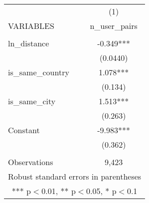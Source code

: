 \begin{tabular}{lc} \hline
 & (1) \\
VARIABLES & n\_user\_pairs \\ \hline
 &  \\
ln\_distance & -0.349*** \\
 & (0.0440) \\
is\_same\_country & 1.078*** \\
 & (0.134) \\
is\_same\_city & 1.513*** \\
 & (0.263) \\
Constant & -9.983*** \\
 & (0.362) \\
 &  \\
 Observations & 9,423 \\ \hline
\multicolumn{2}{c}{ Robust standard errors in parentheses} \\
\multicolumn{2}{c}{ *** p$<$0.01, ** p$<$0.05, * p$<$0.1} \\
\end{tabular}
